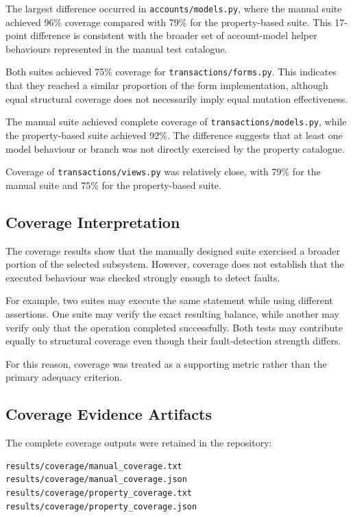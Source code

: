 \documentclass[12pt]{article}
\begin{document}
The largest difference occurred in
\texttt{accounts/models.py}, where the manual suite achieved 96\% coverage
compared with 79\% for the property-based suite. This 17-point difference is
consistent with the broader set of account-model helper behaviours represented
in the manual test catalogue.

Both suites achieved 75\% coverage for
\texttt{transactions/forms.py}. This indicates that they reached a similar
proportion of the form implementation, although equal structural coverage does
not necessarily imply equal mutation effectiveness.

The manual suite achieved complete coverage of
\texttt{transactions/models.py}, while the property-based suite achieved 92\%.
The difference suggests that at least one model behaviour or branch was not
directly exercised by the property catalogue.

Coverage of \texttt{transactions/views.py} was relatively close, with 79\%
for the manual suite and 75\% for the property-based suite.

\subsection{Coverage Interpretation}

The coverage results show that the manually designed suite exercised a broader
portion of the selected subsystem. However, coverage does not establish that
the executed behaviour was checked strongly enough to detect faults.

For example, two suites may execute the same statement while using different
assertions. One suite may verify the exact resulting balance, while another
may verify only that the operation completed successfully. Both tests may
contribute equally to structural coverage even though their fault-detection
strength differs.

For this reason, coverage was treated as a supporting metric rather than the
primary adequacy criterion.

\subsection{Coverage Evidence Artifacts}

The complete coverage outputs were retained in the repository:

\begin{verbatim}
results/coverage/manual_coverage.txt
results/coverage/manual_coverage.json
results/coverage/property_coverage.txt
results/coverage/property_coverage.json
\end{verbatim}
\end{document}
